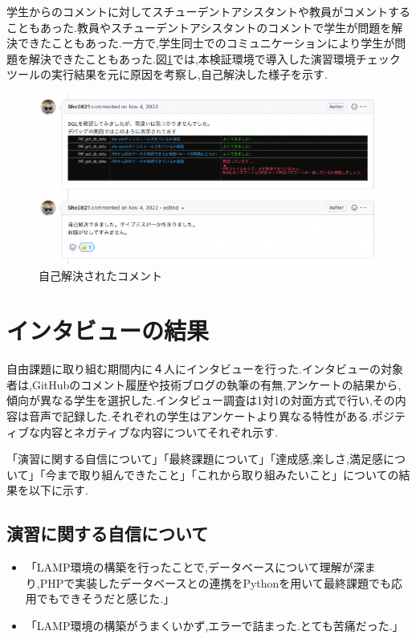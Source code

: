 \documentclass[11pt, a4paper]{jreport}
\begin{document}
学生からのコメントに対してスチューデントアシスタントや教員がコメントすることもあった.教員やスチューデントアシスタントのコメントで学生が問題を解決できたこともあった.一方で,学生同士でのコミュニケーションにより学生が問題を解決できたこともあった.図\ref{fig:grechissue}では,本検証環境で導入した演習環境チェックツールの実行結果を元に原因を考察し,自己解決した様子を示す.

\begin{figure}[H]
\begin{center}
\includegraphics[width=140mm]{./img/grechissue.png}
\caption{自己解決されたコメント}
\label{fig:grechissue}
\end{center}
\end{figure}


\section{インタビューの結果}

自由課題に取り組む期間内に４人にインタビューを行った.インタビューの対象者は,GitHubのコメント履歴や技術ブログの執筆の有無,アンケートの結果から,傾向が異なる学生を選択した.インタビュー調査は1対1の対面方式で行い,その内容は音声で記録した.それぞれの学生はアンケートより異なる特性がある.ポジティブな内容とネガティブな内容についてそれぞれ示す.

「演習に関する自信について」「最終課題について」「達成感,楽しさ,満足感について」「今まで取り組んできたこと」「これから取り組みたいこと」についての結果を以下に示す.

\subsection{演習に関する自信について}

\begin{itemize}
\item 「LAMP環境の構築を行ったことで,データベースについて理解が深まり,PHPで実装したデータベースとの連携をPythonを用いて最終課題でも応用でもできそうだと感じた.」
\item 「LAMP環境の構築がうまくいかず,エラーで詰まった.とても苦痛だった.」
\end{itemize}
\end{document}
